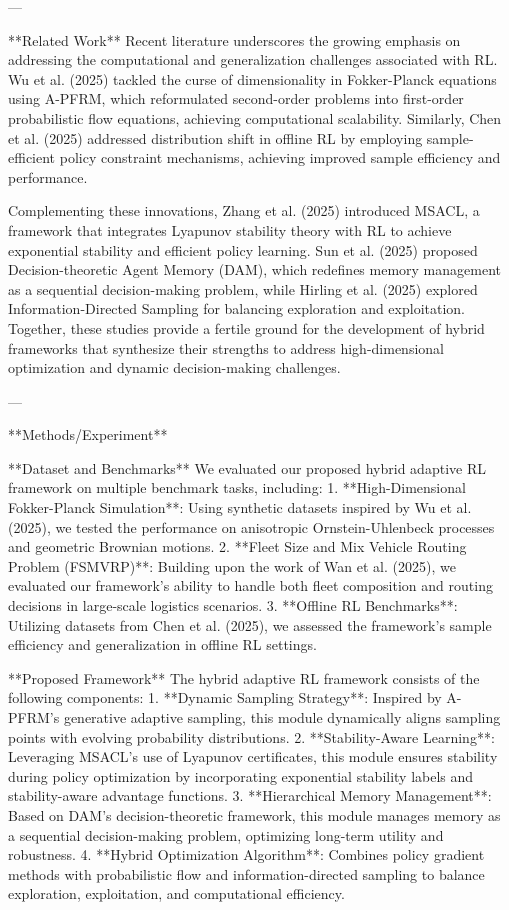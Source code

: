 ---

**Related Work**  
Recent literature underscores the growing emphasis on addressing the computational and generalization challenges associated with RL. Wu et al. (2025) tackled the curse of dimensionality in Fokker-Planck equations using A-PFRM, which reformulated second-order problems into first-order probabilistic flow equations, achieving computational scalability. Similarly, Chen et al. (2025) addressed distribution shift in offline RL by employing sample-efficient policy constraint mechanisms, achieving improved sample efficiency and performance.  

Complementing these innovations, Zhang et al. (2025) introduced MSACL, a framework that integrates Lyapunov stability theory with RL to achieve exponential stability and efficient policy learning. Sun et al. (2025) proposed Decision-theoretic Agent Memory (DAM), which redefines memory management as a sequential decision-making problem, while Hirling et al. (2025) explored Information-Directed Sampling for balancing exploration and exploitation. Together, these studies provide a fertile ground for the development of hybrid frameworks that synthesize their strengths to address high-dimensional optimization and dynamic decision-making challenges.  

---

**Methods/Experiment**  

**Dataset and Benchmarks**  
We evaluated our proposed hybrid adaptive RL framework on multiple benchmark tasks, including:  
1. **High-Dimensional Fokker-Planck Simulation**: Using synthetic datasets inspired by Wu et al. (2025), we tested the performance on anisotropic Ornstein-Uhlenbeck processes and geometric Brownian motions.  
2. **Fleet Size and Mix Vehicle Routing Problem (FSMVRP)**: Building upon the work of Wan et al. (2025), we evaluated our framework's ability to handle both fleet composition and routing decisions in large-scale logistics scenarios.  
3. **Offline RL Benchmarks**: Utilizing datasets from Chen et al. (2025), we assessed the framework's sample efficiency and generalization in offline RL settings.  

**Proposed Framework**  
The hybrid adaptive RL framework consists of the following components:  
1. **Dynamic Sampling Strategy**: Inspired by A-PFRM's generative adaptive sampling, this module dynamically aligns sampling points with evolving probability distributions.  
2. **Stability-Aware Learning**: Leveraging MSACL's use of Lyapunov certificates, this module ensures stability during policy optimization by incorporating exponential stability labels and stability-aware advantage functions.  
3. **Hierarchical Memory Management**: Based on DAM's decision-theoretic framework, this module manages memory as a sequential decision-making problem, optimizing long-term utility and robustness.  
4. **Hybrid Optimization Algorithm**: Combines policy gradient methods with probabilistic flow and information-directed sampling to balance exploration, exploitation, and computational efficiency.  

